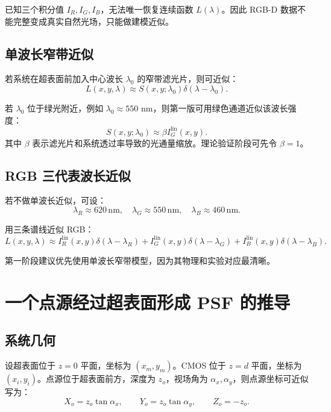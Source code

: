 \documentclass[11pt,a4paper,fontset=none]{ctexart}
\begin{document}
已知三个积分值 $I_R,I_G,I_B$，无法唯一恢复连续函数 $L(\lambda)$。因此 RGB-D 数据不能完整变成真实自然光场，只能做建模近似。

\subsection{单波长窄带近似}

若系统在超表面前加入中心波长 $\lambda_0$ 的窄带滤光片，则可近似：
\begin{equation}
  L(x,y,\lambda)\approx S(x,y;\lambda_0)\delta(\lambda-\lambda_0).
\end{equation}

若 $\lambda_0$ 位于绿光附近，例如 $\lambda_0\approx 550$ nm，则第一版可用绿色通道近似该波长强度：
\begin{equation}
  S(x,y;\lambda_0)\approx \beta I_G^{\mathrm{lin}}(x,y).
\end{equation}
其中 $\beta$ 表示滤光片和系统透过率导致的光通量缩放。理论验证阶段可先令 $\beta=1$。

\subsection{RGB 三代表波长近似}

若不做单波长近似，可设：
\begin{equation}
  \lambda_R\approx 620\,\mathrm{nm},\quad
  \lambda_G\approx 550\,\mathrm{nm},\quad
  \lambda_B\approx 460\,\mathrm{nm}.
\end{equation}

用三条谱线近似 RGB：
\begin{equation}
  L(x,y,\lambda)
  \approx
  I_R^{\mathrm{lin}}(x,y)\delta(\lambda-\lambda_R)
  +I_G^{\mathrm{lin}}(x,y)\delta(\lambda-\lambda_G)
  +I_B^{\mathrm{lin}}(x,y)\delta(\lambda-\lambda_B).
\end{equation}

第一阶段建议优先使用单波长窄带模型，因为其物理和实验对应最清晰。

\section{一个点源经过超表面形成 PSF 的推导}

\subsection{系统几何}

设超表面位于 $z=0$ 平面，坐标为 $(x_m,y_m)$。CMOS 位于 $z=d$ 平面，坐标为 $(x_i,y_i)$。点源位于超表面前方，深度为 $z_o$，视场角为 $\alpha_x,\alpha_y$，则点源坐标可近似写为：
\begin{equation}
  X_o=z_o\tan\alpha_x,\qquad
  Y_o=z_o\tan\alpha_y,\qquad
  Z_o=-z_o.
\end{equation}
\end{document}
